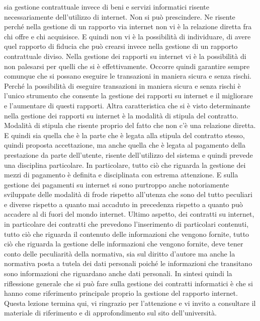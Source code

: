 sia gestione contrattuale invece di beni e servizi informatici risente necessariamente dell'utilizzo di internet. Non si può prescindere. Ne risente perché nella gestione di un rapporto via internet non vi è la relazione diretta fra chi offre e chi acquisisce. E quindi non vi è la possibilità di individuare, di avere quel rapporto di fiducia che può crearsi invece nella gestione di un rapporto contrattuale diviso. Nella gestione dei rapporti su internet vi è la possibilità di non palesarsi per quelli che si è effettivamente. Occorre quindi garantire sempre comunque che si possano eseguire le transazioni in maniera sicura e senza rischi. Perché la possibilità di eseguire transazioni in maniera sicura e senza rischi è l'unico strumento che consente la gestione dei rapporti su internet e il migliorare e l'aumentare di questi rapporti. Altra caratteristica che si è visto determinante nella gestione dei rapporti su internet è la modalità di stipula del contratto. Modalità di stipula che risente proprio del fatto che non c'è una relazione diretta. E quindi sia quella che è la parte che è legata alla stipula del contratto stesso, quindi proposta accettazione, ma anche quella che è legata al pagamento della prestazione da parte dell'utente, risente dell'utilizzo del sistema e quindi prevede una disciplina particolare. In particolare, tutto ciò che riguarda la gestione dei mezzi di pagamento è definita e disciplinata con estrema attenzione. E sulla gestione dei pagamenti su internet si sono purtroppo anche notoriamente sviluppate delle modalità di frode rispetto all'utenza che sono del tutto peculiari e diverse rispetto a quanto mai accaduto in precedenza rispetto a quanto può accadere al di fuori del mondo internet. Ultimo aspetto, dei contratti su internet, in particolare dei contratti che prevedono l'inserimento di particolari contenuti, tutto ciò che riguarda il contenuto delle informazioni che vengono fornite, tutto ciò che riguarda la gestione delle informazioni che vengono fornite, deve tener conto delle peculiarità della normativa, sia sul diritto d'autore ma anche la normativa posta a tutela dei dati personali poiché le informazioni che transitano sono informazioni che riguardano anche dati personali. In sintesi quindi la riflessione generale che si può fare sulla gestione dei contratti informatici è che si hanno come riferimento principale proprio la gestione del rapporto internet. Questa lezione termina qui, vi ringrazio per l'attenzione e vi invito a consultare il materiale di riferimento e di approfondimento sul sito dell'università.